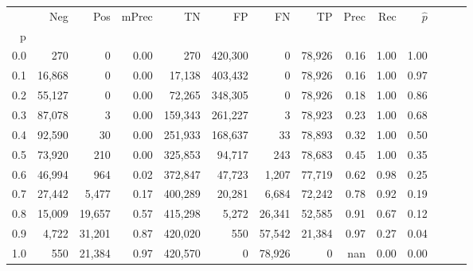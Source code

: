 \begin{tabular}{rrrrrrrrrrrrrr}
\toprule
{} &     Neg &     Pos & mPrec &       TN &       FP &      FN &      TP &  Prec &   Rec & $\hat{p}$ \\
p   &         &         &       &          &          &         &         &       &       &           \\
\midrule
0.0 &     270 &       0 &  0.00 &      270 &  420,300 &       0 &  78,926 &  0.16 &  1.00 &      1.00 \\
0.1 &  16,868 &       0 &  0.00 &   17,138 &  403,432 &       0 &  78,926 &  0.16 &  1.00 &      0.97 \\
0.2 &  55,127 &       0 &  0.00 &   72,265 &  348,305 &       0 &  78,926 &  0.18 &  1.00 &      0.86 \\
0.3 &  87,078 &       3 &  0.00 &  159,343 &  261,227 &       3 &  78,923 &  0.23 &  1.00 &      0.68 \\
0.4 &  92,590 &      30 &  0.00 &  251,933 &  168,637 &      33 &  78,893 &  0.32 &  1.00 &      0.50 \\
0.5 &  73,920 &     210 &  0.00 &  325,853 &   94,717 &     243 &  78,683 &  0.45 &  1.00 &      0.35 \\
0.6 &  46,994 &     964 &  0.02 &  372,847 &   47,723 &   1,207 &  77,719 &  0.62 &  0.98 &      0.25 \\
0.7 &  27,442 &   5,477 &  0.17 &  400,289 &   20,281 &   6,684 &  72,242 &  0.78 &  0.92 &      0.19 \\
0.8 &  15,009 &  19,657 &  0.57 &  415,298 &    5,272 &  26,341 &  52,585 &  0.91 &  0.67 &      0.12 \\
0.9 &   4,722 &  31,201 &  0.87 &  420,020 &      550 &  57,542 &  21,384 &  0.97 &  0.27 &      0.04 \\
1.0 &     550 &  21,384 &  0.97 &  420,570 &        0 &  78,926 &       0 &   nan &  0.00 &      0.00 \\
\bottomrule
\end{tabular}
